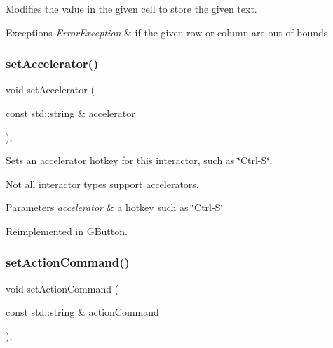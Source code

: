 Modifies the value in the given cell to store the given text. 


\begin{DoxyExceptions}{Exceptions}
{\em Error\+Exception} & if the given row or column are out of bounds \\
\hline
\end{DoxyExceptions}
\mbox{\label{classGInteractor_ad15f102f62e2960576012f1aa0ba4b2e}} 
\subsubsection{\texorpdfstring{set\+Accelerator()}{setAccelerator()}}
{\footnotesize\ttfamily void set\+Accelerator (\begin{DoxyParamCaption}\item[{const std\+::string \&}]{accelerator }\end{DoxyParamCaption})\hspace{0.3cm}{\ttfamily [virtual]}, {\ttfamily [inherited]}}



Sets an accelerator hotkey for this interactor, such as \char`\"{}\+Ctrl-\/\+S\char`\"{}. 

Not all interactor types support accelerators. 
\begin{DoxyParams}{Parameters}
{\em accelerator} & a hotkey such as \char`\"{}\+Ctrl-\/\+S\char`\"{} \\
\hline
\end{DoxyParams}


Reimplemented in \mbox{\hyperlink{classGButton_a502f311e78e7531f8a7b50054ce91c85}{G\+Button}}.

\mbox{\label{classGInteractor_a4b5843fe3030e038a1ba54cc03389bcf}} 
\subsubsection{\texorpdfstring{set\+Action\+Command()}{setActionCommand()}}
{\footnotesize\ttfamily void set\+Action\+Command (\begin{DoxyParamCaption}\item[{const std\+::string \&}]{action\+Command }\end{DoxyParamCaption})\hspace{0.3cm}{\ttfamily [virtual]}, {\ttfamily [inherited]}}



